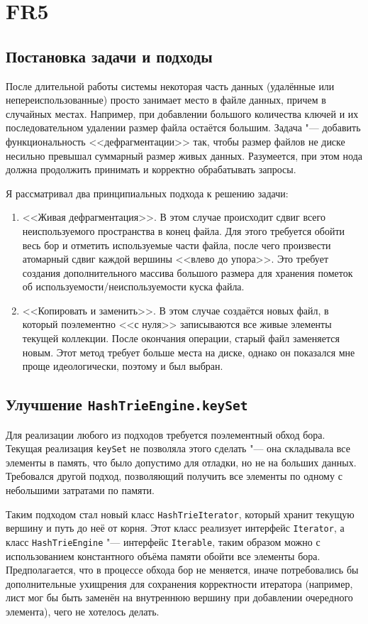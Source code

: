 \documentclass[a4paper]{article}
\renewcommand{\t}{\texttt}
\begin{document}
\section{FR5}
\subsection{Постановка задачи и подходы}
  После длительной работы системы некоторая часть данных (удалённые или непереиспользованные) просто
  занимает место в файле данных, причем в случайных местах. Например, при добавлении большого количества
  ключей и их последовательном удалении размер файла остаётся большим. Задача "--- добавить
  функциональность <<дефрагментации>> так, чтобы размер файлов не диске несильно превышал суммарный размер
  живых данных. Разумеется, при этом нода должна продолжить принимать и корректно обрабатывать запросы.

  Я рассматривал два принципиальных подхода к решению задачи:
  \begin{enumerate}
  \item <<Живая дефрагментация>>. В этом случае происходит сдвиг всего неиспользуемого пространства в конец файла.
        Для этого требуется обойти весь бор и отметить используемые части файла, после чего произвести атомарный
        сдвиг каждой вершины <<влево до упора>>. Это требует создания дополнительного массива большого размера
        для хранения пометок об используемости/неиспользуемости куска файла.
  \item <<Копировать и заменить>>. В этом случае создаётся новых файл, в который поэлементно <<с нуля>>
        записываются все живые элементы текущей коллекции. После окончания операции, старый файл заменяется
        новым. Этот метод требует больше места на диске, однако он показался мне проще идеологически,
        поэтому и был выбран.
  \end{enumerate}

\subsection{Улучшение \t{HashTrieEngine.keySet}}
  Для реализации любого из подходов требуется поэлементный обход бора. Текущая реализация \t{keySet}
  не позволяла этого сделать "--- она складывала все элементы в память, что было допустимо для отладки, но
  не на больших данных. Требовался другой подход, позволяющий получить все элементы по одному с небольшими
  затратами по памяти.

  Таким подходом стал новый класс \t{HashTrieIterator}, который хранит текущую вершину и путь до неё от корня.
  Этот класс реализует интерфейс \t{Iterator}, а класс \t{HashTrieEngine} "--- интерфейс \t{Iterable},
  таким образом можно с использованием константного объёма памяти обойти все элементы бора. Предполагается,
  что в процессе обхода бор не меняется, иначе потребовались бы дополнительные ухищрения для сохранения
  корректности итератора (например, лист мог бы быть заменён на внутреннюю вершину при добавлении очередного
  элемента), чего не хотелось делать.
\end{document}

